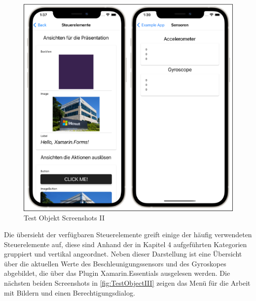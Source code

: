 \begin{figure}[!ht]
 \includegraphics[width=\textwidth,keepaspectratio]{Images/Screenshot/Sensors.png}
 \caption{Test Objekt Screenshots II}
 \label{fig:TestObjectII}
\end{figure}
Die übersieht der verfügbaren Steuerelemente greift einige der häufig verwendeten Steuerelemente auf,  diese sind Anhand der in Kapitel 4 aufgeführten Kategorien gruppiert und vertikal angeordnet.  Neben dieser Darstellung ist eine Übersicht über die aktuellen Werte des Beschleunigungssensors und des Gyroskopes abgebildet,  die über das Plugin Xamarin.Essentials ausgelesen werden.  Die nächsten beiden Screenshots in \ref{fig:TestObjectIII} zeigen das Menü für die Arbeit mit Bildern und einen Berechtigungsdialog.

